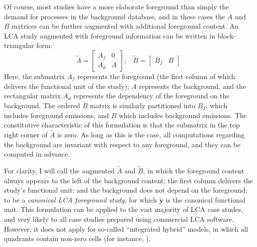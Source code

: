 Of course, most studies have a more elaborate foreground than simply the demand for processes in the background database, and in these cases the $A$ and $B$ matrices can be further augmented with additional foreground content.  An LCA study augmented with foreground information can be written in block-triangular form:
\begin{equation}
\tilde{A} = \left[\begin{array}{cc}
A_f & 0 \\
A_d &  A
  \end{array}
\right];\;\;\;
  \tilde{B} = \left[\begin{array}{cc} B_f & B   \end{array}\right]
\label{eqn:foreground}
\end{equation}
Here, the submatrix $A_f$ represents the foreground (the first column of which delivers the functional unit of the study); $A$ represents the background, and the rectangular matrix $A_d$ represents the dependency of the foreground on the background.  The ordered $\tilde{B}$ matrix is similarly partitioned into $B_f$, which includes foreground emissions, and $B$ which includes background emissions. The constitutive characteristic of this formulation is that the submatrix in the top right corner of $\tilde{A}$ is zero.  As long as this is the case, all computations regarding the background are invariant with respect to any foreground, and they can be computed in advance.


For clarity, I will call the augmented $\tilde{A}$ and $\tilde{B}$, in which the foreground content always appears to the left of the background content; the first column delivers the study's functional unit; and the background does not depend on the foreground; to be a \emph{canonical LCA foreground study}, for which $\tilde{\mathbf{y}}$ is the canonical functional unit.  This formulation can be applied to the vast majority of LCA case studes, and very likely to all case studies prepared using commercial LCA software.  However, it does not apply for so-called ``integrated hybrid'' models, in which all quadrants contain non-zero cells (for instance, \cite{Gibon_2016}).

